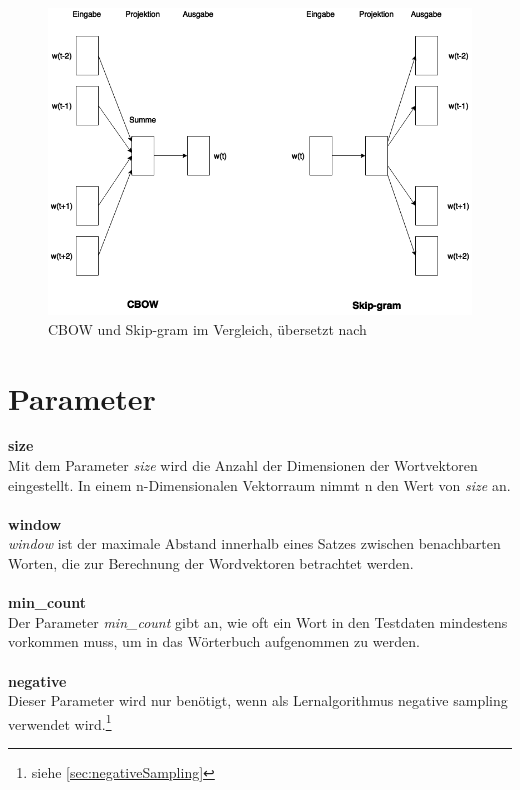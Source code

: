 \documentclass[12pt,a4paper]{report}
\begin{document}
\begin{figure}[h]
  \begin{center}
	\includegraphics[scale=0.55]{CBOWvsSkip-gram.png}
  \end{center}  
  \caption{CBOW und Skip-gram im Vergleich, übersetzt nach \cite{DBLP:journals/corr/abs-1301-3781}}
  \label{cbowvsskipgram}
\end{figure}

	\section{Parameter}
	
	\textbf{size}
	\vspace{1em}\\
	Mit dem Parameter \textit{size} wird die Anzahl der Dimensionen der Wortvektoren eingestellt. In einem n-Dimensionalen Vektorraum nimmt n den Wert von \textit{size} an.\\	
	\vspace{1em}\\
	\textbf{window}
	\vspace{1em}\\
	\textit{window} ist der maximale Abstand innerhalb eines Satzes zwischen benachbarten Worten, die zur Berechnung der Wordvektoren betrachtet werden.\\
	\vspace{1em}\\
	\textbf{min\_count}
	\vspace{1em}\\
	Der Parameter \textit{min\_count} gibt an, wie oft ein Wort in den Testdaten mindestens vorkommen muss, um in das Wörterbuch aufgenommen zu werden.\\
	\vspace{1em}\\
	\textbf{negative}
	\vspace{1em}\\
	Dieser Parameter wird nur benötigt, wenn als Lernalgorithmus negative sampling verwendet wird.\footnote{siehe \ref{sec:negativeSampling}}
	
\end{document}
